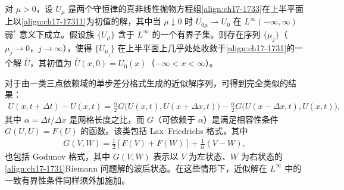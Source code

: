 \documentclass[../../main.tex]{subfiles}
\begin{document}
\begin{theorem}[两律方程组的消失黏性极限]\label{theorem:ch17-两律消失黏性}
对 $\mu>0$，设 $U_\mu$ 是两个守恒律的真非线性抛物方程组\eqref{align:ch17-1733}在上半平面上以\eqref{align:ch17-17311}为初值的解，其中当 $\mu\downarrow0$ 时 $U_{0\mu}\rightharpoonup U_0$ 在 $L^\infty(-\infty,\infty)$ 弱$^*$ 意义下成立。假设族 $\{U_\mu\}$ 含于 $L^\infty$ 的一个有界子集。则存在序列 $\{\mu_j\}$（$\mu_j\to0$，$j\to\infty$），使得 $\{U_{\mu_j}\}$ 在上半平面上几乎处处收敛于\eqref{align:ch17-1731}的一个解 $\bar U$，其初值为 $\bar U(x,0)=U_0(x)$（$-\infty<x<\infty$）。
\end{theorem}

对于由一类三点依赖域的单步差分格式生成的近似解序列，可得到完全类似的结果：
\begin{align}
U(x,t+\Delta t)-U(x,t)=\frac{\alpha}{2}G\bigl(U(x,t),U(x+\Delta x,t)\bigr)-\frac{\alpha}{2}G\bigl(U(x-\Delta x,t),U(x,t)\bigr),
\label{align:ch17-17611}
\end{align}
其中 $\alpha=\Delta t/\Delta x$ 是网格长度之比，而 $G$（可依赖于 $\alpha$）是满足相容性条件 $G(U,U)=F(U)$ 的函数。该类包括 Lax--Friedrichs 格式，其中
\begin{align}
G(V,W)=\frac{1}{2}[F(V)+F(W)]+\frac{1}{\alpha}(V-W),
\label{align:ch17-17612}
\end{align}
也包括 Godunov 格式，其中 $G(V,W)$ 表示以 $V$ 为左状态、$W$ 为右状态的\eqref{align:ch17-1731}Riemann 问题解的波后状态。在这些情形下，近似解在 $L^\infty$ 中的一致有界性条件同样须外加施加。
\end{document}
